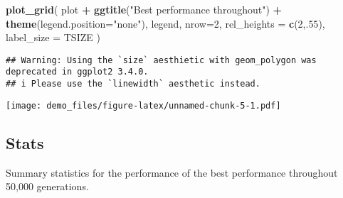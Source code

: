 \documentclass[]{book}
\newenvironment{Shaded}{\begin{snugshade}}{\end{snugshade}}
\newcommand{\DataTypeTok}[1]{\textcolor[rgb]{0.13,0.29,0.53}{#1}}
\newcommand{\DecValTok}[1]{\textcolor[rgb]{0.00,0.00,0.81}{#1}}
\newcommand{\KeywordTok}[1]{\textcolor[rgb]{0.13,0.29,0.53}{\textbf{#1}}}
\newcommand{\NormalTok}[1]{#1}
\newcommand{\OperatorTok}[1]{\textcolor[rgb]{0.81,0.36,0.00}{\textbf{#1}}}
\newcommand{\OtherTok}[1]{\textcolor[rgb]{0.56,0.35,0.01}{#1}}
\newcommand{\StringTok}[1]{\textcolor[rgb]{0.31,0.60,0.02}{#1}}
\begin{document}
\begin{Shaded}
\begin{Highlighting}[]
\KeywordTok{plot_grid}\NormalTok{(}
\NormalTok{  plot }\OperatorTok{+}
\StringTok{    }\KeywordTok{ggtitle}\NormalTok{(}\StringTok{"Best performance throughout"}\NormalTok{) }\OperatorTok{+}
\StringTok{    }\KeywordTok{theme}\NormalTok{(}\DataTypeTok{legend.position=}\StringTok{"none"}\NormalTok{),}
\NormalTok{  legend,}
  \DataTypeTok{nrow=}\DecValTok{2}\NormalTok{,}
  \DataTypeTok{rel_heights =} \KeywordTok{c}\NormalTok{(}\DecValTok{2}\NormalTok{,.}\DecValTok{55}\NormalTok{),}
  \DataTypeTok{label_size =}\NormalTok{ TSIZE}
\NormalTok{)}
\end{Highlighting}
\end{Shaded}

\begin{verbatim}
## Warning: Using the `size` aesthietic with geom_polygon was deprecated in ggplot2 3.4.0.
## i Please use the `linewidth` aesthetic instead.
\end{verbatim}

\texttt{[image: demo\_files/figure-latex/unnamed-chunk-5-1.pdf]}

\hypertarget{stats}{%
\subsection{Stats}\label{stats}}

Summary statistics for the performance of the best performance throughout 50,000 generations.

\begin{Shaded}
\end{Shaded}
\end{document}
